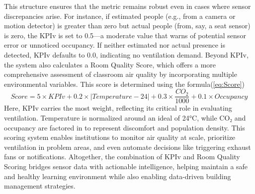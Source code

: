 This structure ensures that the metric remains robust even in cases where sensor discrepancies arise. For instance, if estimated people (e.g., from a camera or motion detector) is greater than zero but actual people (from, say, a seat sensor) is zero, the KPIv is set to 0.5—a moderate value that warns of potential sensor error or unnoticed occupancy. If neither estimated nor actual presence is detected, KPIv defaults to 0.0, indicating no ventilation demand. Beyond KPIv, the system also calculates a Room Quality Score, which offers a more comprehensive assessment of classroom air quality by incorporating multiple environmental variables. This score is determined using the formula(\ref{eq:Score})
\begin{equation}
    Score = 5 \times KPIv + 0.2 \times |Temperature - 24| + 0.3 \times \frac{CO_2}{1000} + 0.1 \times Occupancy
    \label{eq:Score}
\end{equation}
Here, KPIv carries the most weight, reflecting its critical role in evaluating ventilation. Temperature is normalized around an ideal of 24°C, while CO₂ and occupancy are factored in to represent discomfort and population density. This scoring system enables institutions to monitor air quality at scale, prioritize ventilation in problem areas, and even automate decisions like triggering exhaust fans or notifications. Altogether, the combination of KPIv and Room Quality Scoring bridges sensor data with actionable intelligence, helping maintain a safe and healthy learning environment while also enabling data-driven building management strategies.


